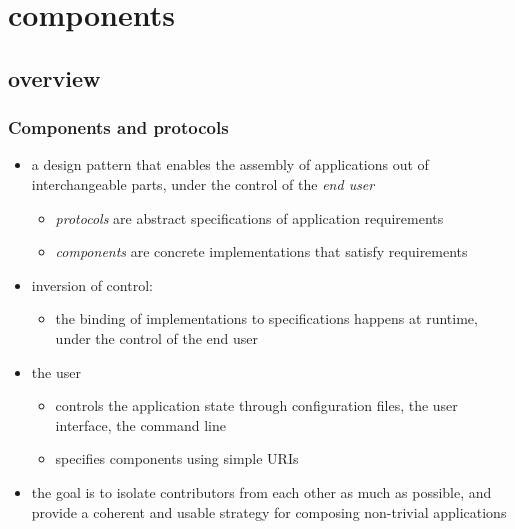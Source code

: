 %
%


\section{components}
\subsection{overview}

\begin{frame}
%
  \frametitle{Components and protocols}
%
  \begin{itemize}
%
    \item a design pattern that enables the assembly of applications out of interchangeable
      parts, under the control of the {\em end user}
      \begin{itemize}
      \item {\em protocols} are abstract specifications of application requirements
      \item {\em components} are concrete implementations that satisfy requirements
      \end{itemize}
%
    \item inversion of control:
      \begin{itemize}
      \item the binding of implementations to specifications happens at runtime, under the
        control of the end user
      \end{itemize}
%
    \item the user 
      \begin{itemize}
      \item controls the application state through configuration files, the user interface, the
        command line
      \item specifies components using simple URIs
      \end{itemize}
%
    \item the goal is to isolate contributors from each other as much as possible, and provide
      a coherent and usable strategy for composing non-trivial applications
%
  \end{itemize}
%
\end{frame}

